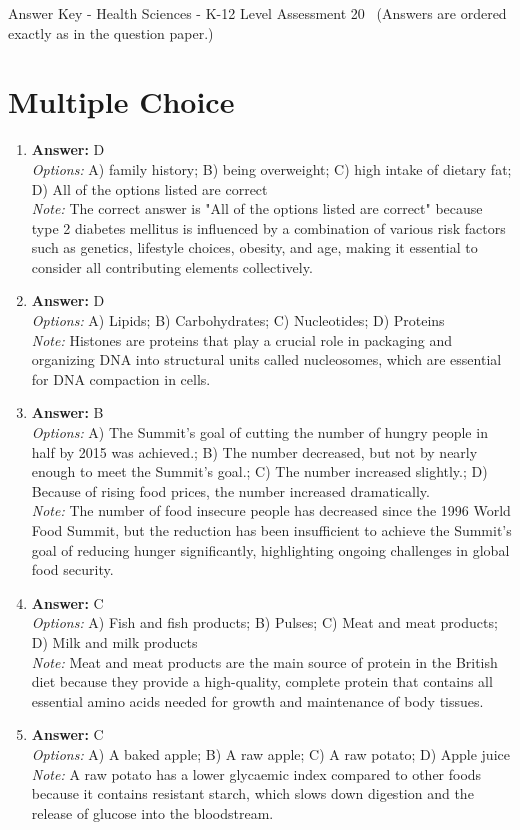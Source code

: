 \documentclass[12pt]{article}
\begin{document}
\begin{center}
Answer Key - Health Sciences - K-12 Level Assessment 20 \
\small (Answers are ordered exactly as in the question paper.)
\end{center}

\section*{Multiple Choice}
\begin{enumerate}[label=\arabic*.]
\item \textbf{Answer:} D
\\ \textit{Options:} A) family history; B) being overweight; C) high intake of dietary fat; D) All of the options listed are correct
\\ \textit{Note:} The correct answer is "All of the options listed are correct" because type 2 diabetes mellitus is influenced by a combination of various risk factors such as genetics, lifestyle choices, obesity, and age, making it essential to consider all contributing elements collectively.
\item \textbf{Answer:} D
\\ \textit{Options:} A) Lipids; B) Carbohydrates; C) Nucleotides; D) Proteins
\\ \textit{Note:} Histones are proteins that play a crucial role in packaging and organizing DNA into structural units called nucleosomes, which are essential for DNA compaction in cells.
\item \textbf{Answer:} B
\\ \textit{Options:} A) The Summit's goal of cutting the number of hungry people in half by 2015 was achieved.; B) The number decreased, but not by nearly enough to meet the Summit's goal.; C) The number increased slightly.; D) Because of rising food prices, the number increased dramatically.
\\ \textit{Note:} The number of food insecure people has decreased since the 1996 World Food Summit, but the reduction has been insufficient to achieve the Summit's goal of reducing hunger significantly, highlighting ongoing challenges in global food security.
\item \textbf{Answer:} C
\\ \textit{Options:} A) Fish and fish products; B) Pulses; C) Meat and meat products; D) Milk and milk products
\\ \textit{Note:} Meat and meat products are the main source of protein in the British diet because they provide a high-quality, complete protein that contains all essential amino acids needed for growth and maintenance of body tissues.
\item \textbf{Answer:} C
\\ \textit{Options:} A) A baked apple; B) A raw apple; C) A raw potato; D) Apple juice
\\ \textit{Note:} A raw potato has a lower glycaemic index compared to other foods because it contains resistant starch, which slows down digestion and the release of glucose into the bloodstream.
\end{enumerate}
\end{document}
